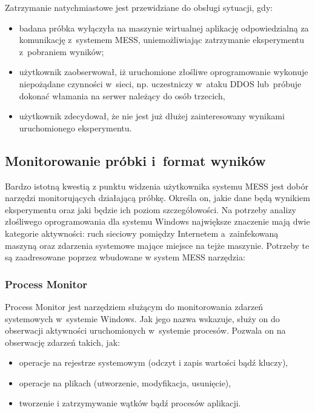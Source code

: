 \documentclass[a4paper,12pt,oneside]{article}
\begin{document}
	Zatrzymanie natychmiastowe jest przewidziane do obsługi sytuacji, gdy:
	\begin{itemize}
		\item badana próbka wyłączyła na maszynie wirtualnej aplikację odpowiedzialną za komunikację z~systemem MESS, uniemożliwiając zatrzymanie eksperymentu z~pobraniem wyników;
		\item użytkownik zaobserwował, iż uruchomione złośliwe oprogramowanie wykonuje niepożądane czynności w~sieci, np. uczestniczy w~ataku DDOS lub~próbuje dokonać włamania na serwer należący do osób trzecich,
		\item użytkownik zdecydował, że nie jest już dłużej zainteresowany wynikami uruchomionego eksperymentu.
	\end{itemize}
		
	\subsection{Monitorowanie próbki i~format wyników}
	
	Bardzo istotną kwestią z punktu widzenia użytkownika systemu MESS jest dobór narzędzi monitorujących działającą próbkę. Określa on, jakie dane będą wynikiem eksperymentu oraz jaki będzie ich poziom szczegółowości. Na potrzeby analizy złośliwego oprogramowania dla systemu Windows największe znaczenie mają dwie kategorie aktywności: ruch sieciowy pomiędzy Internetem a~zainfekowaną maszyną oraz zdarzenia systemowe mające miejsce na tejże maszynie. Potrzeby te są zaadresowane poprzez wbudowane w system MESS narzędzia:
	
	\subsubsection{Process Monitor}
	
	Process Monitor \cite{tool-procmon} jest narzędziem służącym do monitorowania zdarzeń systemowych w~systemie Windows. Jak jego nazwa wskazuje, służy on do obserwacji aktywności uruchomionych w~systemie procesów. Pozwala on na obserwację zdarzeń takich, jak:
	\begin{itemize}
		\item operacje na rejestrze systemowym (odczyt i zapis wartości bądź kluczy),
		\item operacje na plikach (utworzenie, modyfikacja, usunięcie),
		\item tworzenie i zatrzymywanie wątków bądź procesów aplikacji.
	\end{itemize}
	
\end{document}
